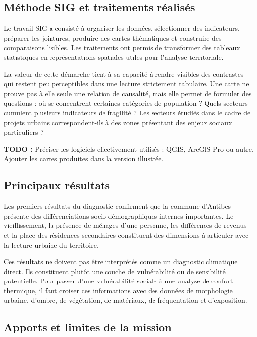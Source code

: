 \documentclass[11pt,a4paper]{report}
\newcommand{\todo}[1]{\textcolor{todored}{\textbf{TODO :} #1}}
\begin{document}
\subsection{Méthode SIG et traitements réalisés}

Le travail SIG a consisté à organiser les données, sélectionner des indicateurs, préparer les jointures, produire des cartes thématiques et construire des comparaisons lisibles. Les traitements ont permis de transformer des tableaux statistiques en représentations spatiales utiles pour l'analyse territoriale.

La valeur de cette démarche tient à sa capacité à rendre visibles des contrastes qui restent peu perceptibles dans une lecture strictement tabulaire. Une carte ne prouve pas à elle seule une relation de causalité, mais elle permet de formuler des questions : où se concentrent certaines catégories de population ? Quels secteurs cumulent plusieurs indicateurs de fragilité ? Les secteurs étudiés dans le cadre de projets urbains correspondent-ils à des zones présentant des enjeux sociaux particuliers ?

\todo{Préciser les logiciels effectivement utilisés : QGIS, ArcGIS Pro ou autre. Ajouter les cartes produites dans la version illustrée.}

\subsection{Principaux résultats}

Les premiers résultats du diagnostic confirment que la commune d'Antibes présente des différenciations socio-démographiques internes importantes. Le vieillissement, la présence de ménages d'une personne, les différences de revenus et la place des résidences secondaires constituent des dimensions à articuler avec la lecture urbaine du territoire.

Ces résultats ne doivent pas être interprétés comme un diagnostic climatique direct. Ils constituent plutôt une couche de vulnérabilité ou de sensibilité potentielle. Pour passer d'une vulnérabilité sociale à une analyse de confort thermique, il faut croiser ces informations avec des données de morphologie urbaine, d'ombre, de végétation, de matériaux, de fréquentation et d'exposition.

\subsection{Apports et limites de la mission}
\end{document}
